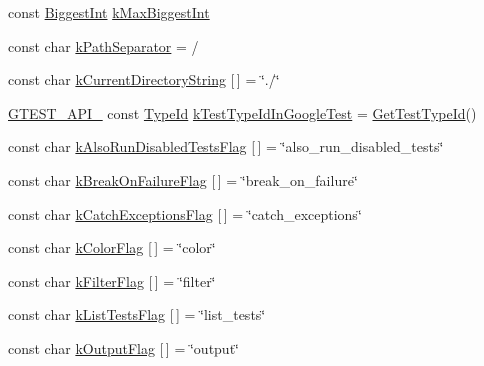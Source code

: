 \begin{DoxyCompactItemize}
\item 
const \hyperlink{namespacetesting_1_1internal_a05c6bd9ede5ccdf25191a590d610dcc6}{Biggest\+Int} \hyperlink{namespacetesting_1_1internal_ad901880198832bc166d2493096b451f7}{k\+Max\+Biggest\+Int}
\item 
const char \hyperlink{namespacetesting_1_1internal_afcd71adaa9d1e6df7b282a17fc48125c}{k\+Path\+Separator} = \textquotesingle{}/\textquotesingle{}
\item 
const char \hyperlink{namespacetesting_1_1internal_a23a8e9527d0e544e7df2d64ad549ce3e}{k\+Current\+Directory\+String} \mbox{[}$\,$\mbox{]} = \char`\"{}./\char`\"{}
\item 
\hyperlink{gtest-port_8h_aa73be6f0ba4a7456180a94904ce17790}{G\+T\+E\+S\+T\+\_\+\+A\+P\+I\+\_\+} const \hyperlink{namespacetesting_1_1internal_ab1114197d3c657d8b7f8e0c5caa12d00}{Type\+Id} \hyperlink{namespacetesting_1_1internal_acac7993efabbd9dd62c1e9c7d143a72f}{k\+Test\+Type\+Id\+In\+Google\+Test} = \hyperlink{namespacetesting_1_1internal_ad0d66d56ead224263cd100c1d6bfc562}{Get\+Test\+Type\+Id}()
\item 
const char \hyperlink{namespacetesting_1_1internal_ad5882ed0ceadc0f23090f0f08b5d495b}{k\+Also\+Run\+Disabled\+Tests\+Flag} \mbox{[}$\,$\mbox{]} = \char`\"{}also\+\_\+run\+\_\+disabled\+\_\+tests\char`\"{}
\item 
const char \hyperlink{namespacetesting_1_1internal_a804c907155bfee3a6616ae3ca04048d0}{k\+Break\+On\+Failure\+Flag} \mbox{[}$\,$\mbox{]} = \char`\"{}break\+\_\+on\+\_\+failure\char`\"{}
\item 
const char \hyperlink{namespacetesting_1_1internal_af4bb309802e83df0927097e6e4201a38}{k\+Catch\+Exceptions\+Flag} \mbox{[}$\,$\mbox{]} = \char`\"{}catch\+\_\+exceptions\char`\"{}
\item 
const char \hyperlink{namespacetesting_1_1internal_a884ff13b75232fbe7daa0caf46f1de66}{k\+Color\+Flag} \mbox{[}$\,$\mbox{]} = \char`\"{}color\char`\"{}
\item 
const char \hyperlink{namespacetesting_1_1internal_a8cb8ee7fe7659e6916a0108dffa2f7dc}{k\+Filter\+Flag} \mbox{[}$\,$\mbox{]} = \char`\"{}filter\char`\"{}
\item 
const char \hyperlink{namespacetesting_1_1internal_a1d3cfebffefbf35f7033d4941493a8ff}{k\+List\+Tests\+Flag} \mbox{[}$\,$\mbox{]} = \char`\"{}list\+\_\+tests\char`\"{}
\item 
const char \hyperlink{namespacetesting_1_1internal_abd5368e00a31d175c6696cf76cbbde10}{k\+Output\+Flag} \mbox{[}$\,$\mbox{]} = \char`\"{}output\char`\"{}

\end{DoxyCompactItemize}
